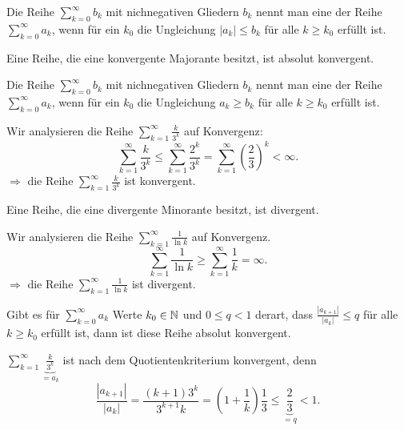 \begin{defn}
	Die Reihe $\sum_{k=0}^\infty b_k$ mit nichnegativen Gliedern $b_k$ nennt man eine  der Reihe $\sum_{k=0}^\infty a_k$, wenn für ein $k_0$ die Ungleichung $|a_k| \le b_k$ für alle $k \ge k_0$ erfüllt ist. 
\end{defn} 

\begin{thm}[Majorantenkriterium] 
	Eine Reihe, die eine konvergente Majorante besitzt, ist absolut konvergent. 
\end{thm} 

\begin{defn}
	Die Reihe $\sum_{k=0}^\infty b_k$ mit nichnegativen Gliedern $b_k$ nennt man eine  der Reihe $\sum_{k=0}^\infty a_k$, wenn für ein $k_0$ die Ungleichung $a_k \ge b_k$ für alle $k \ge k_0$ erfüllt ist. 
\end{defn} 

\begin{bsp}
	Wir analysieren die Reihe $\sum_{k=1}^\infty \frac{k}{3^k}$ auf Konvergenz: 
	\[
		\sum_{k=1}^\infty \frac{k}{3^k}\le \sum_{k=1}^\infty \frac{2^k}{3^k} = \sum_{k=1}^\infty \left( \frac{2}{3} \right)^k < \infty. 
	\]
	$\Rightarrow$ die Reihe $\sum_{k=1}^\infty \frac{k}{3^k}$ ist konvergent. 
\end{bsp} 

\begin{thm}[Minorantenkriterium]
	Eine Reihe, die eine divergente Minorante besitzt, ist divergent. 
\end{thm} 

\begin{bsp} 
	Wir analysieren die Reihe $\sum_{k=1}^\infty \frac{1}{\ln k}$ auf Konvergenz. 
	\[
		\sum_{k=1}^\infty \frac{1}{\ln k} \ge \sum_{k=1}^\infty \frac{1}{k} = \infty. 
	\]
	$\Rightarrow$ die Reihe $\sum_{k=1}^\infty \frac{1}{\ln k}$ ist divergent. 
\end{bsp} 

\begin{thm} 
	Gibt es für $\sum_{k=0}^\infty a_k$ Werte $k_0 \in \mathbb{N}$ und $0 \le q < 1$ derart, dass $\frac{|a_{k+1}|}{|a_k|} \le q$ für alle $k \ge k_0$ erfüllt ist, dann ist diese Reihe absolut konvergent. 
\end{thm} 

\begin{bsp} 
	$\sum_{k=1}^\infty \underbrace{\frac{k}{3^k}}_{= a_k}$ ist nach dem Quotientenkriterium konvergent, denn 
	\[
		\frac{|a_{k+1}|}{|a_k|} = \frac{(k+1) 3^k }{3^{k+1} k} = \left( 1 + \frac{1}{k} \right) \frac{1}{3} \le \underbrace{\frac{2}{3}}_{= q} < 1. 
	\]
\end{bsp} 

